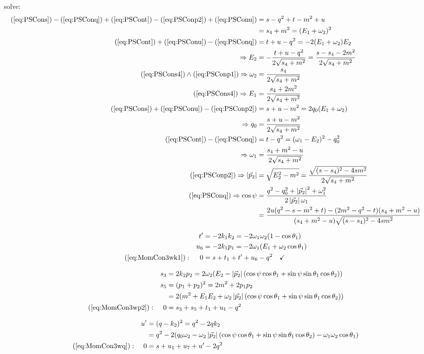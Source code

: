 \documentclass[
  ngerman,		%
  a4paper,		%
  11pt,			%
  DIV=12,		%
  parskip=half  	%
]{scrartcl}
\begin{document}
solve:
\begin{align}
(\ref{eq:PSCons}) - (\ref{eq:PSConq}) + (\ref{eq:PSCont}) - (\ref{eq:PSConp2}) + (\ref{eq:PSConu}) &= s-q^2+t-m^2+u\\
 &= s_4+m^2 = (E_1+\omega_2)^2 \label{eq:PSCons4}\\
(\ref{eq:PSCont}) + (\ref{eq:PSConu}) - (\ref{eq:PSConq}) &= t+u-q^2 = -2(E_1+\omega_2)E_2\\
\Rightarrow E_2 &= -\frac{t+u-q^2}{2\sqrt{s_4+m^2}} =\frac{s-s_4-2m^2}{2\sqrt{s_4+m^2}} \label{eq:PSConE2}\\
(\ref{eq:PSCons4})\land (\ref{eq:PSConp1}) \Rightarrow \omega_2 &= \frac{s_4}{2\sqrt{s_4+m^2}} \label{eq:PSConom2} \\
(\ref{eq:PSCons4})\Rightarrow E_1 &= \frac{s_4+2m^2}{2\sqrt{s_4+m^2}} \label{eq:PSConE1} \\
(\ref{eq:PSCons})+(\ref{eq:PSConu})-(\ref{eq:PSConp2}) &= s+u-m^2 =2q_0(E_1+\omega_2)\\
\Rightarrow q_0 &= \frac{s+u-m^2}{2\sqrt{s_4+m^2}} \label{eq:PSConq0}\\
(\ref{eq:PSCont}) - (\ref{eq:PSConq}) &= t-q^2 = (\omega_1-E_2)^2 - q_0^2\\
\Rightarrow \omega_1 &= \frac{s_4+m^2-u}{2\sqrt{s_4+m^2}} \label{eq:PSConom1}\\
(\ref{eq:PSConp2}) \Rightarrow \left|\vec p_2\right| &= \sqrt{E_2^2 - m^2} = \frac {\sqrt{(s-s_4)^2-4sm^2}} {2\sqrt{s_4+m^2}}\label{eq:PSConabsp2}\\
(\ref{eq:PSConq}) \Rightarrow \cos\psi &= \frac{q^2-q_0^2+\left|\vec p_2\right|^2+\omega_1^2}{2\left|\vec p_2\right|\omega_1}\\
 &= \frac {2u(q^2-s-m^2+t)-(2m^2-q^2-t)(s_4+m^2-u)} {(s_4+m^2-u)\sqrt{(s-s_4)^2-4sm^2}}\label{eq:PSConabcos}
\end{align}

\begin{align}
&&t' &= -2k_1k_2 = -2\omega_1\omega_2(1-\cos\theta_1)\\
&&u_6 &= - 2k_1p_1 = -2\omega_1(E_1 + \omega_2\cos\theta_1)\\
(\ref{eq:MomCon3wk1}): &&0 &= s+t_1+t'+u_6-q^2\quad\checkmark
\end{align}

\begin{align}
&&s_3 &= 2k_2p_2 = 2\omega_2(E_2-\left|\vec p_2\right|(\cos\psi\cos\theta_1+\sin\psi\sin\theta_1\cos\theta_2))\\
&&s_5 &= (p_1+p_2)^2 = 2m^2+2p_1p_2\\
&& &= 2(m^2+E_1E_2+\omega_2\left|\vec p_2\right|(\cos\psi\cos\theta_1+\sin\psi\sin\theta_1\cos\theta_2))\\
(\ref{eq:MomCon3wp2}): &&0 &= s_3+s_5+t_1+u_1-q^2
\end{align}

\begin{align}
&&u' &=(q-k_2)^2 = q^2-2qk_2\\
&& &= q^2-2(q_0\omega_2 -\omega_2\left|\vec p_2\right|(\cos\psi\cos\theta_1+\sin\psi\sin\theta_1\cos\theta_2)-\omega_1\omega_2\cos\theta_1)\\
(\ref{eq:MomCon3wq}): &&0 &=s+u_1+u_7+u'-2q^2
\end{align}
\end{document}
